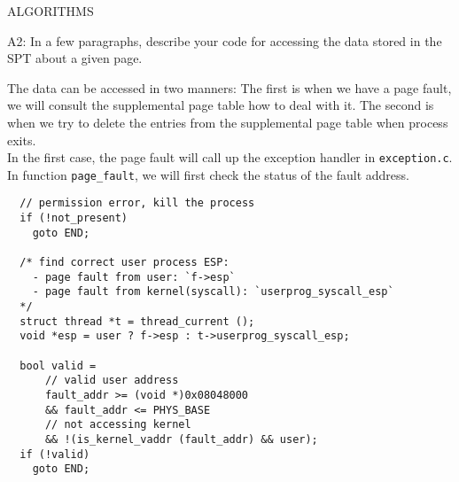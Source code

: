 \begin{aspect}{ALGORITHMS}
  \begin{qc}
    A2: In a few paragraphs, describe your code for accessing the data stored in the SPT about a given page.
  \end{qc}
  The data can be accessed in two manners: The first is when we have a page fault, we will consult the supplemental page table how to deal with it. The second is when we try to delete the entries from the supplemental page table when process exits. \\
  In the first case, the page fault will call up the exception handler in \texttt{exception.c}. In function \texttt{page\_fault}, we will first check the status of the fault address.
  \begin{lstlisting}
  // permission error, kill the process
  if (!not_present)
    goto END;

  /* find correct user process ESP:
    - page fault from user: `f->esp`
    - page fault from kernel(syscall): `userprog_syscall_esp`
  */
  struct thread *t = thread_current ();
  void *esp = user ? f->esp : t->userprog_syscall_esp;

  bool valid =
      // valid user address
      fault_addr >= (void *)0x08048000
      && fault_addr <= PHYS_BASE
      // not accessing kernel
      && !(is_kernel_vaddr (fault_addr) && user);
  if (!valid)
    goto END;


\end{lstlisting}
\end{aspect}

